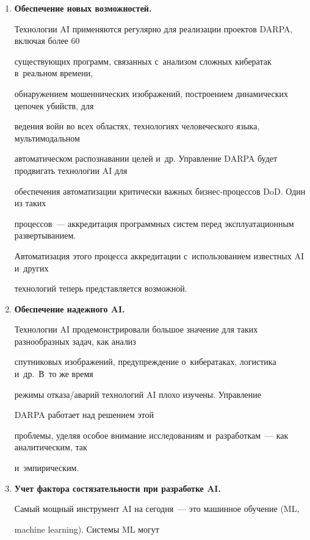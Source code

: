   \begin{enumerate}[1.]





\item %


\textbf{Обеспечение новых возможностей.}


Технологии AI применяются регулярно для реализации проектов \mbox{DARPA}, включая более 60


существующих программ, связанных с~анализом сложных кибератак в~реальном времени,


обнаружением мошеннических изображений, построением динамических цепочек убийств, для


ведения войн во всех областях, технологиях человеческого языка, мультимодальном


автоматическом распознавании целей и~др. Управ\-ле\-ние \mbox{DARPA} будет продвигать технологии AI для


обеспечения автоматизации критически важных биз\-нес-про\-цес\-сов DoD. Один из таких


процессов~--- аккредитация программных систем перед эксплуатационным развертыванием.


Автоматизация этого процесса аккредитации с~использованием известных AI и~других


технологий теперь представляется возможной.


\item %


\textbf{Обеспечение надежного AI.}


Технологии AI продемонстрировали большое значение для таких разнообразных задач, как анализ


спутниковых изображений, предупреждение о~кибератаках, логистика и~др.\ В~то же время


режимы от\-ка\-за\!/\!ава\-рий технологий AI плохо изучены. Управ\-ле\-ние


\mbox{DARPA} работает над решением этой


проблемы, уделяя особое внимание исследованиям и~разработкам~--- как аналитическим, так


и~эмпирическим.


\item %


\textbf{Учет фактора состязательности при разработке AI.}


Самый мощный инструмент AI на сегодня~--- это машинное обучение (ML,


machine learning). Сис\-те\-мы ML могут



\end{enumerate}
